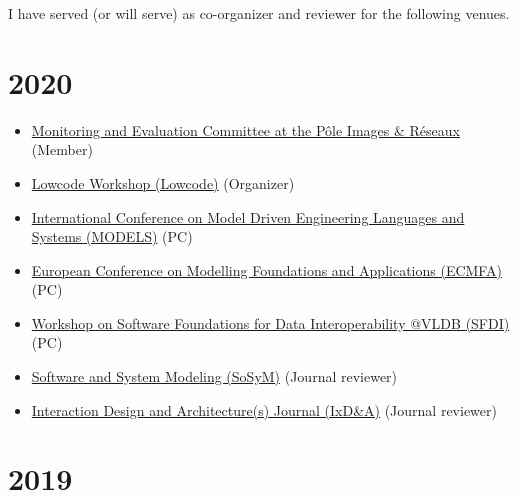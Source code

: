 I have served (or will serve) as co-organizer and reviewer for the
following venues.

\hypertarget{section}{%
\section{2020}\label{section}}

\begin{itemize}
\tightlist
\item
  \href{http://www.images-et-reseaux.com/en}{Monitoring and Evaluation
  Committee at the Pôle Images \& Réseaux} (Member)
\item
  \href{https://lowcode-workshop.github.io/}{Lowcode Workshop (Lowcode)}
  (Organizer)
\item
  \href{https://modelsconference.org/}{International Conference on Model
  Driven Engineering Languages and Systems (MODELS)} (PC)
\item
  \href{https://staf2019.win.tue.nl/events/ecmfa20/}{European Conference
  on Modelling Foundations and Applications (ECMFA)} (PC)
\item
  \href{http://www.biscuits.work/fourth-workshop/}{Workshop on Software
  Foundations for Data Interoperability @VLDB (SFDI)} (PC)
\item
  \href{http://www.sosym.org/}{Software and System Modeling (SoSyM)}
  (Journal reviewer)
\item
  \href{http://interfacce.mifav.uniroma2.it/inevent/events/idea2010/?s=9}{Interaction
  Design and Architecture(s) Journal (IxD\&A)} (Journal reviewer)
\end{itemize}

\hypertarget{section-1}{%
\section{2019}\label{section-1}}

